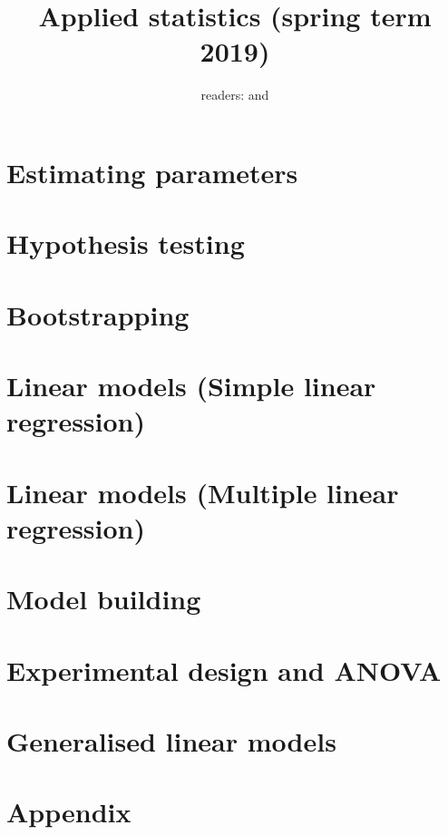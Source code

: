 \documentclass[british,a4paper,order=firstname]{mathscript}
\title{\textbf{Applied statistics (spring term 2019)}}
\author{readers: \person{Nikolai Bode} and \person{Ksenia Shalonova}}
\begin{document}
\pagestyle{plain}

\maketitle

\hypertarget{tocpage}{}
\tableofcontents
{}

\pagebreak
{}
\pagestyle{fancy}

\section{Estimating parameters}


\pagebreak
\section{Hypothesis testing}


\pagebreak
\section{Bootstrapping}

\pagebreak
\section{Linear models (Simple linear regression)}

\pagebreak
\section{Linear models (Multiple linear regression)}

\pagebreak
\section{Model building}

\pagebreak
\section{Experimental design and ANOVA}

\pagebreak
\section{Generalised linear models}


\pagebreak

\section{Appendix}



\printindex
\end{document}
